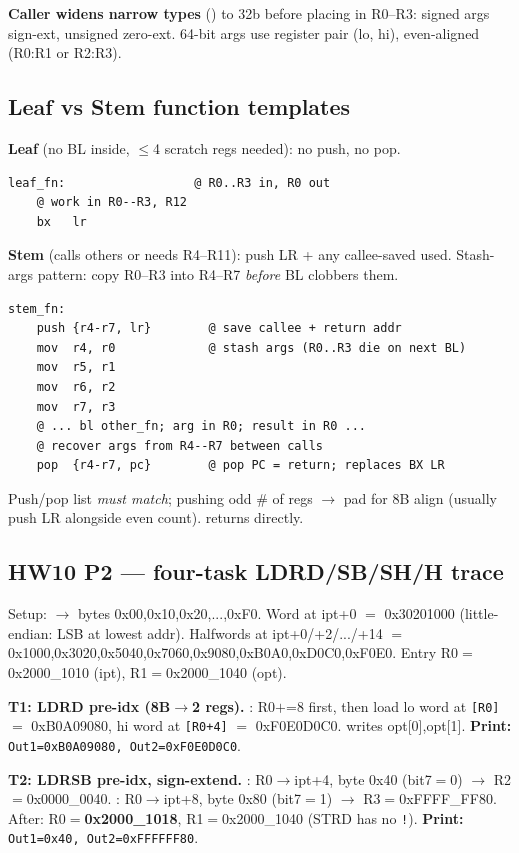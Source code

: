 \textbf{Caller widens narrow types} () to 32b before
placing in R0--R3: signed args sign-ext, unsigned zero-ext. 64-bit args use
register pair (lo, hi), even-aligned (R0:R1 or R2:R3).

\subsection{Leaf vs Stem function templates}
\textbf{Leaf} (no BL inside, $\le$4 scratch regs needed): no push, no pop.
\begin{lstlisting}
leaf_fn:                  @ R0..R3 in, R0 out
    @ work in R0--R3, R12
    bx   lr
\end{lstlisting}

\textbf{Stem} (calls others or needs R4--R11): push LR + any callee-saved used.
Stash-args pattern: copy R0--R3 into R4--R7 \emph{before} BL clobbers them.
\begin{lstlisting}
stem_fn:
    push {r4-r7, lr}        @ save callee + return addr
    mov  r4, r0             @ stash args (R0..R3 die on next BL)
    mov  r5, r1
    mov  r6, r2
    mov  r7, r3
    @ ... bl other_fn; arg in R0; result in R0 ...
    @ recover args from R4--R7 between calls
    pop  {r4-r7, pc}        @ pop PC = return; replaces BX LR
\end{lstlisting}
Push/pop list \emph{must match}; pushing odd \# of regs $\to$ pad for 8B align
(usually push LR alongside even count).  returns directly.

\subsection{HW10 P2 --- four-task LDRD/SB/SH/H trace}
Setup:  $\to$ bytes 0x00,0x10,0x20,...,0xF0. Word at ipt+0
$=$ 0x30201000 (little-endian: LSB at lowest addr). Halfwords at
ipt+0/+2/.../+14 $=$ 0x1000,0x3020,0x5040,0x7060,0x9080,0xB0A0,0xD0C0,0xF0E0.
Entry R0$=$0x2000\_1010 (ipt), R1$=$0x2000\_1040 (opt).

\textbf{T1: LDRD pre-idx (8B$\to$2 regs).}
 : R0$+$=8 first, then load lo word at \texttt{[R0]}
$=$ 0xB0A09080, hi word at \texttt{[R0+4]} $=$ 0xF0E0D0C0.
 writes opt[0],opt[1].
\textbf{Print:} \texttt{Out1=0xB0A09080, Out2=0xF0E0D0C0}.

\textbf{T2: LDRSB pre-idx, sign-extend.}
: R0$\to$ipt+4, byte 0x40 (bit7$=$0) $\to$ R2$=$0x0000\_0040.
: R0$\to$ipt+8, byte 0x80 (bit7$=$1) $\to$ R3$=$0xFFFF\_FF80.
After: R0$=$\textbf{0x2000\_1018}, R1$=$0x2000\_1040 (STRD has no \texttt{!}).
\textbf{Print:} \texttt{Out1=0x40, Out2=0xFFFFFF80}.

